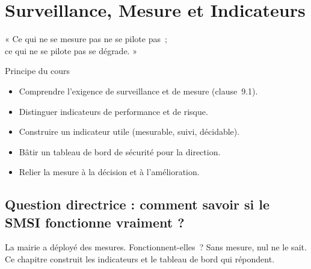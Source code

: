 
\chapter{Surveillance, Mesure et Indicateurs}
\label{chap:indicateurs}

\epigraph{%
    « Ce qui ne se mesure pas ne se pilote pas~;\\
    ce qui ne se pilote pas se dégrade. »%
}{Principe du cours}


\begin{boxobjectifs}
\begin{itemize}
    \item Comprendre l'exigence de surveillance et de mesure (clause~9.1).
    \item Distinguer indicateurs de performance et de risque.
    \item Construire un indicateur utile (mesurable, suivi, décidable).
    \item Bâtir un tableau de bord de sécurité pour la direction.
    \item Relier la mesure à la décision et à l'amélioration.
\end{itemize}
\end{boxobjectifs}

\bigskip

\section*{Question directrice : comment savoir si le SMSI fonctionne vraiment ?}

La mairie a déployé des mesures. Fonctionnent-elles~? Sans mesure, nul ne le
sait. Ce chapitre construit les indicateurs et le tableau de bord qui
répondent.

